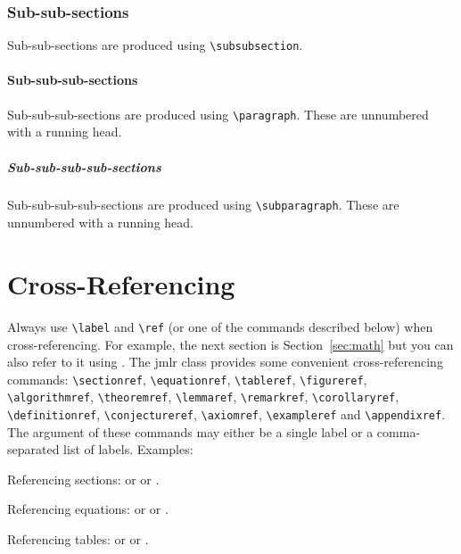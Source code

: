 \documentclass[pmlr,twocolumn]{jmlr} %
\begin{document}
\subsubsection{Sub-sub-sections}

Sub-sub-sections are produced using \verb|\subsubsection|.

\paragraph{Sub-sub-sub-sections}

Sub-sub-sub-sections are produced using \verb|\paragraph|.
These are unnumbered with a running head.

\subparagraph{Sub-sub-sub-sub-sections}

Sub-sub-sub-sub-sections are produced using \verb|\subparagraph|.
These are unnumbered with a running head.

\section{Cross-Referencing}

Always use \verb|\label| and \verb|\ref| (or one of the commands
described below) when cross-referencing.  For example, the next
section is Section~\ref{sec:math} but you can also refer to it using
. The \textsf{jmlr} class
provides some convenient cross-referencing commands:
\verb|\sectionref|, \verb|\equationref|, \verb|\tableref|,
\verb|\figureref|, \verb|\algorithmref|, \verb|\theoremref|,
\verb|\lemmaref|, \verb|\remarkref|, \verb|\corollaryref|,
\verb|\definitionref|, \verb|\conjectureref|, \verb|\axiomref|,
\verb|\exampleref| and \verb|\appendixref|. The argument of these
commands may either be a single label or a comma-separated list
of labels. Examples:

Referencing sections:  or
 or
.

Referencing equations:  or
 or
.

Referencing tables:  or
 or
.
\end{document}
